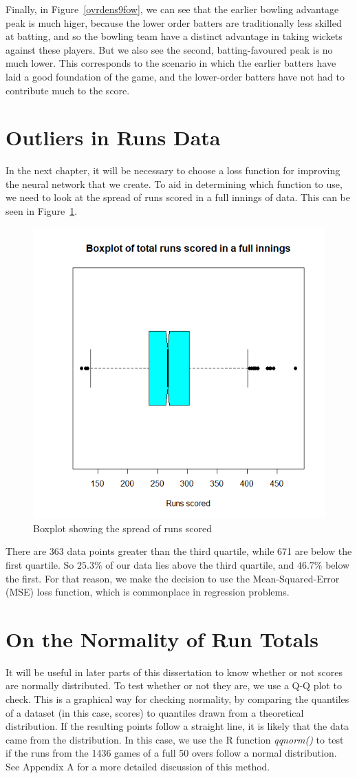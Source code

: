 Finally, in Figure~\ref{ovrdens9fow}, we can see that the earlier bowling advantage peak is much higer, because the lower order batters are traditionally less skilled 
at batting, and so the bowling team have a distinct advantage in taking wickets against these players. But we also see the second, batting-favoured peak is no much lower.
This corresponds to the scenario in which the earlier batters have laid a good foundation of the game, and the lower-order batters have not had to contribute much to the score.

\section{Outliers in Runs Data}
\label{mse}
In the next chapter, it will be necessary to choose a loss function for improving the neural network that we create. To aid in determining which function to use, we need to look at the
spread of runs scored in a full innings of data. This can be seen in Figure~\ref{runsbox}.

\begin{figure}[h]
    \centering
    \includegraphics[width=0.4\linewidth]{figures/runsbox.png}
    \caption{Boxplot showing the spread of runs scored}
    \label{runsbox}
\end{figure}

There are 363 data points greater than the third quartile, while 671 are below the first quartile. So $25.3\%$ of our data lies above the third quartile, and
$46.7\%$ below the first. For that reason, we make the decision to use the Mean-Squared-Error (MSE) loss function, which is commonplace in regression problems.

\section{On the Normality of Run Totals}
It will be useful in later parts of this dissertation to know whether or not scores are normally distributed. To test whether or not 
they are, we use a Q-Q plot to check. This is a graphical way for checking normality, by comparing the quantiles of a dataset (in this case, scores) to quantiles
drawn from a theoretical distribution. If the resulting points follow a straight line, it is likely that the data came from the distribution.
In this case, we use the R function \textit{qqnorm()} to test if the runs from the 1436 games of a full 50 overs follow a normal distribution. See Appendix A for 
a more detailed discussion of this method.

